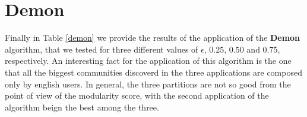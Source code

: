 \section{Demon} %
\label{sec:demon}
    Finally in Table \ref{demon} we provide the results of the application of the \textbf{Demon} algorithm, that
    we tested for three different values of $\epsilon$, $0.25$, $0.50$ and $0.75$, respectively. An interesting
    fact for the application of this algorithm is the one that all the biggest communities discoverd in the three
    applications are composed only by english users. In general, the three partitions are not so good from the
    point of view of the modularity score, with the second application of the algorithm beign the best among the
    three.

    \begin{table}[H]
        \centering
        \begin{subtable}{\textwidth}
        \end{subtable}
        \caption{Evaluation of the partition obtained by the application of the Demon algorithm.}
        \label{demon}
    \end{table}


